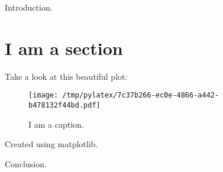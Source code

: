 \documentclass{article}%
\begin{document}
%
\normalsize%
Introduction.%
\section{I am a section}%
Take a look at this beautiful plot:%


\begin{figure}[htbp]%
\centering%
\texttt{[image: /tmp/pylatex/7c37b266-ec0e-4866-a442-b478132f44bd.pdf]}%
\caption{I am a caption.}%
\end{figure}

%
Created using matplotlib.

%
Conclusion.%
\end{document}
